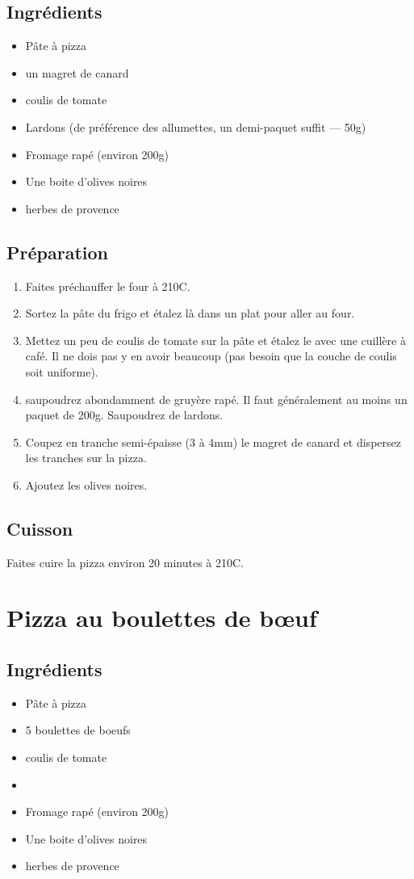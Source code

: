 \subsection*{Ingrédients}
\begin{itemize}
\item Pâte à pizza
\item un magret de canard
\item coulis de tomate
\item Lardons (de préférence des allumettes, un demi-paquet suffit --- 50g)
\item Fromage rapé (environ 200g)
\item Une boite d'olives noires
\item herbes de provence
\end{itemize}

\subsection*{Préparation}
\begin{enumerate}
\item Faites préchauffer le four à 210\degres C.
\item Sortez la pâte du frigo et étalez là dans un plat pour aller au four.
\item Mettez un peu de coulis de tomate sur la pâte et étalez le avec une cuillère à café. Il ne dois pas y en avoir beaucoup (pas besoin que la couche de coulis soit uniforme).
\item saupoudrez abondamment de gruyère rapé. Il faut généralement au moins un paquet de 200g. Saupoudrez de lardons.
\item Coupez en tranche semi-épaisse (3 à 4mm) le magret de canard et dispersez les tranches sur la pizza.
\item Ajoutez les olives noires.
\end{enumerate}

\subsection*{Cuisson}
Faites cuire la pizza environ 20 minutes à 210\degres C.

\newpage
\section{Pizza au boulettes de bœuf}
\subsection*{Ingrédients}
\begin{itemize}
\item Pâte à pizza
\item 5 boulettes de boeufs
\item coulis de tomate
\item
\item Fromage rapé (environ 200g)
\item Une boite d'olives noires
\item herbes de provence
\end{itemize}


